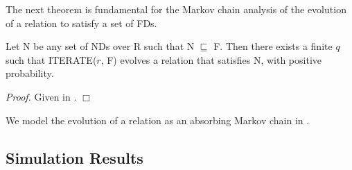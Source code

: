 {\line
\begin{figure}[ht]
\begin{center}
\end{center}
\end{figure}
}
\medskip

The next theorem is fundamental for the Markov chain analysis of 
the evolution of a relation to satisfy a set of FDs.

\begin{theorem}\label{theorem:iter}
\begin{rm}
Let N be any set of NDs over R such that N $\sqsubseteq$ F.
Then there exists a finite $q$ such that ITERATE($r$, F) 
evolves a relation that satisfies N, with positive probability.
\end{rm}
\end{theorem}
{\em Proof.} 
Given in \cite{cl96}. $\Box$
\medskip

We model the evolution of a relation as an absorbing Markov chain in \cite{cl96}.


\subsection{Simulation Results}


